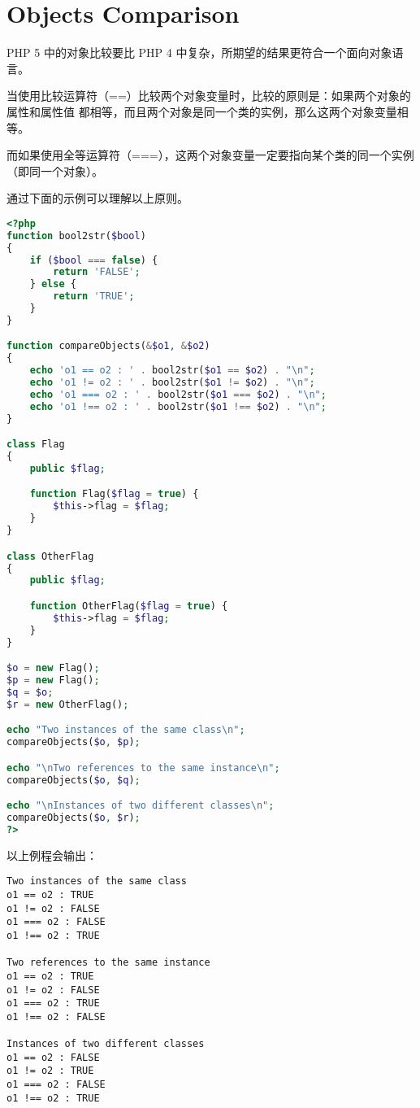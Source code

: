 \chapter{Objects Comparison}

PHP 5 中的对象比较要比 PHP 4 中复杂，所期望的结果更符合一个面向对象语言。

当使用比较运算符（==）比较两个对象变量时，比较的原则是：如果两个对象的属性和属性值 都相等，而且两个对象是同一个类的实例，那么这两个对象变量相等。

而如果使用全等运算符（===），这两个对象变量一定要指向某个类的同一个实例（即同一个对象）。

通过下面的示例可以理解以上原则。


\begin{lstlisting}[language=PHP]
<?php
function bool2str($bool)
{
    if ($bool === false) {
        return 'FALSE';
    } else {
        return 'TRUE';
    }
}

function compareObjects(&$o1, &$o2)
{
    echo 'o1 == o2 : ' . bool2str($o1 == $o2) . "\n";
    echo 'o1 != o2 : ' . bool2str($o1 != $o2) . "\n";
    echo 'o1 === o2 : ' . bool2str($o1 === $o2) . "\n";
    echo 'o1 !== o2 : ' . bool2str($o1 !== $o2) . "\n";
}

class Flag
{
    public $flag;

    function Flag($flag = true) {
        $this->flag = $flag;
    }
}

class OtherFlag
{
    public $flag;

    function OtherFlag($flag = true) {
        $this->flag = $flag;
    }
}

$o = new Flag();
$p = new Flag();
$q = $o;
$r = new OtherFlag();

echo "Two instances of the same class\n";
compareObjects($o, $p);

echo "\nTwo references to the same instance\n";
compareObjects($o, $q);

echo "\nInstances of two different classes\n";
compareObjects($o, $r);
?>
\end{lstlisting}

以上例程会输出：

\begin{verbatim}
Two instances of the same class
o1 == o2 : TRUE
o1 != o2 : FALSE
o1 === o2 : FALSE
o1 !== o2 : TRUE

Two references to the same instance
o1 == o2 : TRUE
o1 != o2 : FALSE
o1 === o2 : TRUE
o1 !== o2 : FALSE

Instances of two different classes
o1 == o2 : FALSE
o1 != o2 : TRUE
o1 === o2 : FALSE
o1 !== o2 : TRUE
\end{verbatim}



